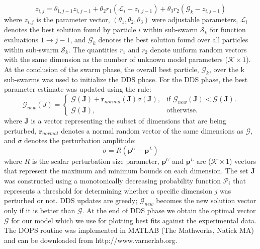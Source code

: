 \documentclass[12pt]{article}
\begin{document}
\begin{equation}\label{eqn:update-rule}
	{z}_{i,j} = \theta_{1,j-1}{z}_{i,j-1} + \theta_{2}{r}_{1}\left(\mathcal{L}_{i} - {z}_{i,j-1}\right) + \theta_{3}{r}_{2}\left(\mathcal{G}_{k} - {z}_{i,j-1}\right)
\end{equation}
where ${z}_{i,j}$ is the parameter vector, $\left(\theta_{1},\theta_{2},\theta_{3}\right)$ were adjustable parameters, $\mathcal{L}_{i}$ denotes the best solution found by particle $i$ within sub-swarm
$\mathcal{S}_{k}$ for function evaluations $1\rightarrow j-1$, and
$\mathcal{G}_{k}$ denotes the best solution found over all particles within sub-swarm $\mathcal{S}_{k}$.
The quantities $r_{1}$ and $r_{2}$ denote uniform random vectors with the same dimension as the number of unknown model parameters ($\mathcal{K}\times{1}$).
At the conclusion of the swarm phase, the overall best particle, $\mathcal{G}_{k}$, over the k sub-swarms was used to initialize the DDS phase.
For the DDS phase, the best parameter estimate was updated using the rule:
\begin{equation}
  \mathcal{G}_{new}({J})=\begin{cases}
    \mathcal{G}(\mathbf{J})+\mathbf{r}_{normal}(\mathbf{J})\sigma(\mathbf{J}), & \text{if $\mathcal{G}_{new}(\mathbf{J})<\mathcal{G}(\mathbf{J})$}.\\
    \mathcal{G}(\mathbf{J}), & \text{otherwise}.
  \end{cases}
\end{equation}
where $\mathbf{J}$ is a vector representing the subset of dimensions that are being perturbed, $\mathbf{r}_{normal}$ denotes a normal random vector of the same dimensions as $\mathcal{G}$,
and $\sigma$ denotes the perturbation amplitude:
\begin{equation}
	\sigma = {R}(\mathbf{p}^U - \mathbf{p}^L)
\end{equation}
where ${R}$ is the scalar perturbation size parameter, $\mathbf{p}^U$ and $\mathbf{p}^L$ are ($\mathcal{K}\times{1}$) vectors that represent the maximum and minimum bounds on each dimension. The set $\mathbf{J}$ was constructed using a monotonically decreasing probability function $\mathcal{P}_{i}$ that represents a threshold for determining whether a specific dimension $j$ was perturbed or not. DDS updates are greedy; $\mathcal{G}_{new}$ becomes the new solution vector only if it is better than $\mathcal{G}$.
At the end of DDS phase we obtain the optimal vector  $\mathcal{G}$ for our model which we use for plotting best fits against the experimental data. The DOPS routine was implemented in MATLAB (The Mathworks, Natick MA) and can be downloaded from http://www.varnerlab.org.
\end{document}
